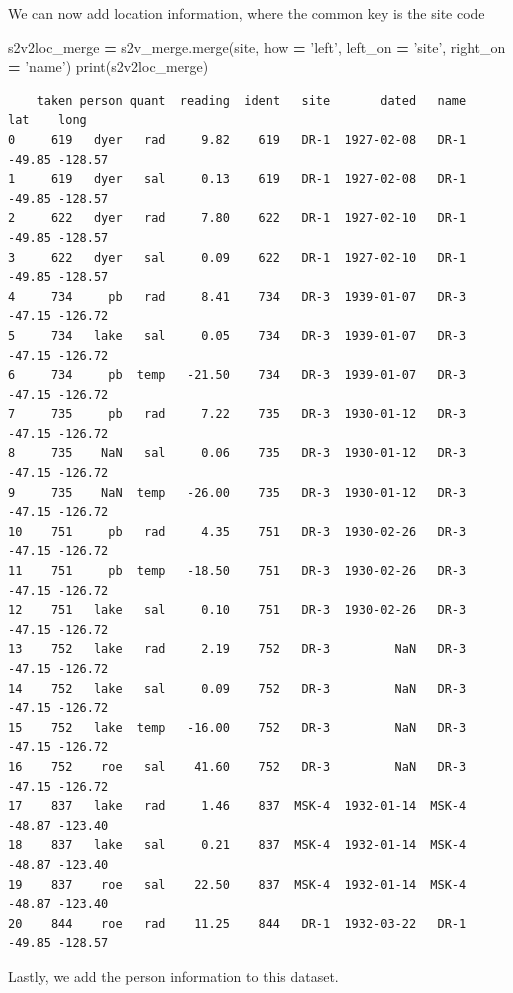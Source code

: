 \documentclass[
  letterpaper,
]{scrbook}
\newenvironment{Shaded}{\begin{snugshade}}{\end{snugshade}}
\newcommand{\BuiltInTok}[1]{#1}
\newcommand{\NormalTok}[1]{#1}
\newcommand{\OperatorTok}[1]{\textcolor[rgb]{0.81,0.36,0.00}{\textbf{#1}}}
\newcommand{\StringTok}[1]{\textcolor[rgb]{0.31,0.60,0.02}{#1}}
\begin{document}
We can now add location information, where the common key is the site code

\begin{Shaded}
\begin{Highlighting}[]
\NormalTok{s2v2loc_merge }\OperatorTok{=}\NormalTok{ s2v_merge.merge(site, how }\OperatorTok{=} \StringTok{'left'}\NormalTok{, left_on }\OperatorTok{=} \StringTok{'site'}\NormalTok{, right_on }\OperatorTok{=} \StringTok{'name'}\NormalTok{)}
\BuiltInTok{print}\NormalTok{(s2v2loc_merge)}
\end{Highlighting}
\end{Shaded}

\begin{verbatim}
    taken person quant  reading  ident   site       dated   name    lat    long
0     619   dyer   rad     9.82    619   DR-1  1927-02-08   DR-1 -49.85 -128.57
1     619   dyer   sal     0.13    619   DR-1  1927-02-08   DR-1 -49.85 -128.57
2     622   dyer   rad     7.80    622   DR-1  1927-02-10   DR-1 -49.85 -128.57
3     622   dyer   sal     0.09    622   DR-1  1927-02-10   DR-1 -49.85 -128.57
4     734     pb   rad     8.41    734   DR-3  1939-01-07   DR-3 -47.15 -126.72
5     734   lake   sal     0.05    734   DR-3  1939-01-07   DR-3 -47.15 -126.72
6     734     pb  temp   -21.50    734   DR-3  1939-01-07   DR-3 -47.15 -126.72
7     735     pb   rad     7.22    735   DR-3  1930-01-12   DR-3 -47.15 -126.72
8     735    NaN   sal     0.06    735   DR-3  1930-01-12   DR-3 -47.15 -126.72
9     735    NaN  temp   -26.00    735   DR-3  1930-01-12   DR-3 -47.15 -126.72
10    751     pb   rad     4.35    751   DR-3  1930-02-26   DR-3 -47.15 -126.72
11    751     pb  temp   -18.50    751   DR-3  1930-02-26   DR-3 -47.15 -126.72
12    751   lake   sal     0.10    751   DR-3  1930-02-26   DR-3 -47.15 -126.72
13    752   lake   rad     2.19    752   DR-3         NaN   DR-3 -47.15 -126.72
14    752   lake   sal     0.09    752   DR-3         NaN   DR-3 -47.15 -126.72
15    752   lake  temp   -16.00    752   DR-3         NaN   DR-3 -47.15 -126.72
16    752    roe   sal    41.60    752   DR-3         NaN   DR-3 -47.15 -126.72
17    837   lake   rad     1.46    837  MSK-4  1932-01-14  MSK-4 -48.87 -123.40
18    837   lake   sal     0.21    837  MSK-4  1932-01-14  MSK-4 -48.87 -123.40
19    837    roe   sal    22.50    837  MSK-4  1932-01-14  MSK-4 -48.87 -123.40
20    844    roe   rad    11.25    844   DR-1  1932-03-22   DR-1 -49.85 -128.57
\end{verbatim}

Lastly, we add the person information to this dataset.
\end{document}
